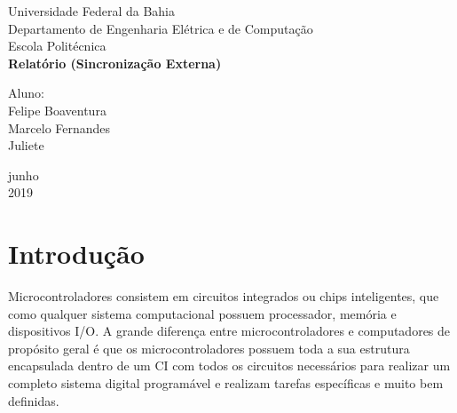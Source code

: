 \documentclass[a4paper, 12pt]{article}
\begin{document}

\begin{titlepage}
	\begin{center}
	

		\Huge{Universidade Federal da Bahia}\\
		\large{Departamento de Engenharia Elétrica e de Computação}\\ 
		\large{Escola Politécnica}\\ 
		\vspace{15pt}
        \vspace{95pt}
        \textbf{\LARGE{Relatório (Sincronização Externa) }}\\
		\vspace{8,5cm}
	\end{center}
	
	\begin{flushleft}
		\begin{tabbing}
			Aluno: \\
			Felipe Boaventura \\
			Marcelo Fernandes\\
			Juliete  \\
	\end{tabbing}
 \end{flushleft}
	\vspace{1cm}
	
	\begin{center}
		\vspace{\fill}
			 junho\\
		 2019
			\end{center}
\end{titlepage}

\newpage
\newpage
\tableofcontents
\thispagestyle{empty}

\newpage
{}
\section{Introdução}
Microcontroladores consistem em circuitos integrados ou chips inteligentes, que como qualquer sistema computacional possuem processador, memória e dispositivos I/O. A grande diferença entre microcontroladores e computadores de propósito geral é que os microcontroladores possuem toda a sua estrutura encapsulada dentro de um CI com todos os circuitos necessários para realizar um completo sistema digital programável e realizam tarefas específicas e muito bem definidas.
\end{document}
